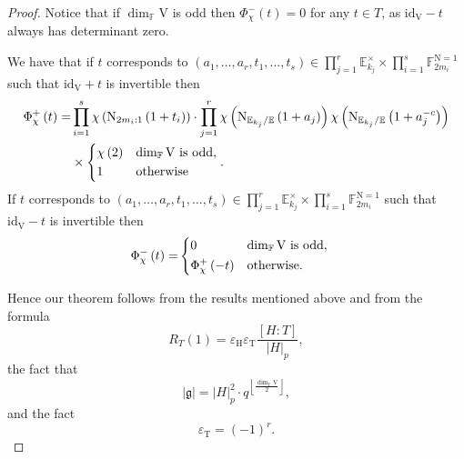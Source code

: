 \documentclass[12pt, reqno]{amsart}
\theoremstyle{definition}
\theoremstyle{definition}
\theoremstyle{definition}
\newcommand{\multiplicativegroup}[1]{#1^{\times}}
\newcommand{\idmap}{\mathrm{id}}
\newcommand{\sizeof}[1]{\left|#1\right|}
\newcommand{\hermitianSpace}{\mathrm{V}}
\newcommand{\grpIndex}[2]{\left[#1:#2\right]}
\newcommand{\minusInvolution}[1]{#1^{-c}}
\newcommand{\FieldNorm}[2]{\mathrm{N}_{#1:#2}}
\newcommand{\aFieldNorm}{\mathrm{N}}
\newcommand{\finiteField}{\mathbb{F}}
\newcommand{\quadraticExtension}{\mathbb{E}}
\newcommand{\finiteFieldExtension}[1]{\finiteField_{#1}}
\newcommand{\quadraticFieldExtension}[1]{\quadraticExtension_{#1}}
\newcommand{\NormOneGroup}[1]{\finiteFieldExtension{#1}^{\aFieldNorm = 1}}
\newcommand{\posJacobiKernel}[1]{\Phi^{+}_{#1}}
\newcommand{\negJacobiKernel}[1]{\Phi^{-}_{#1}}
\newcommand{\lieAlgebra}{\mathfrak{g}}
\newcommand{\algebraicGroup}[1]{\boldsymbol{\mathrm{#1}}}
\begin{document}
\begin{proof}
	Notice that if $\dim_{\finiteField} \hermitianSpace$ is odd then $\negJacobiKernel{\chi}\left(t\right) = 0$ for any $t \in T$, as $\idmap_{\hermitianSpace} - t$ always has determinant zero.
	
	We have that if $t$ corresponds to $\left(a_1,\dots,a_r,t_1,\dots,t_s\right) \in \prod_{j=1}^r \multiplicativegroup{\quadraticFieldExtension{k_j}} \times \prod_{i=1}^s \NormOneGroup{2m_i}$ such that $\idmap_{\hermitianSpace} + t$ is invertible then \begin{align*}
		\posJacobiKernel{\chi}\left(t\right) =& \prod_{i=1}^s \chi\left(\FieldNorm{2m_i}{1}\left(1 + t_i\right)\right) \cdot \prod_{j=1}^r \chi\left(\aFieldNorm_{\quadraticFieldExtension{k_j} / \quadraticExtension}\left(1 + a_j\right)\right) \chi\left(\aFieldNorm_{\quadraticFieldExtension{k_j} / \quadraticExtension}\left(1 + \minusInvolution{a_j}\right)\right) \\
		& \times  \begin{dcases}
			\chi\left(2\right) & \dim_{\finiteField} \hermitianSpace \text{ is odd},\\
			1 & \text{otherwise}
		\end{dcases}.
	\end{align*}
	If $t$ corresponds to $\left(a_1,\dots,a_r,t_1,\dots,t_s\right) \in \prod_{j=1}^r \multiplicativegroup{\quadraticFieldExtension{k_j}} \times \prod_{i=1}^s \NormOneGroup{2m_i}$ such that $\idmap_{\hermitianSpace} - t$ is invertible then \begin{align*}
		\negJacobiKernel{\chi}\left(t\right) =& \begin{dcases}
			0 & \dim_{\finiteField} \hermitianSpace \text{ is odd},\\
			\posJacobiKernel{\chi}\left(-t\right) & \text{otherwise.}
		\end{dcases}
	\end{align*}
	

	
	Hence our theorem follows from the results mentioned above and from the formula $$R_T\left(1\right) = \varepsilon_{\algebraicGroup{H}} \varepsilon_{\algebraicGroup{T}} \frac{\grpIndex{H}{T}}{\sizeof{H}_p},$$ the fact that $$ \sizeof{\lieAlgebra} = \sizeof{H}_p^2 \cdot q^{\left\lfloor\frac{\dim_{\finiteField} \hermitianSpace}{2}\right\rfloor},$$
	and the fact \begin{equation*}
		\varepsilon_{\algebraicGroup{T}} = \left(-1\right)^r.
	\end{equation*}
\end{proof}
\end{document}
